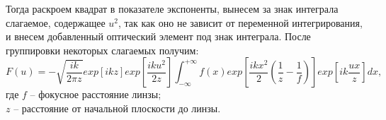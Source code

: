 {    Тогда раскроем квадрат в показателе экспоненты, вынесем за знак интеграла слагаемое, содержащее $u^2$,
    так как оно не зависит от переменной интегрирования, и внесем добавленный оптический элемент под знак интеграла.
    После группировки некоторых слагаемых получим:
    \begin{equation*}
        F(u) = - \sqrt{\frac{ik}{2 \pi z}}exp[ikz] exp[{ \frac{iku^2}{2z} }] \int_{-\infty}^{+\infty}f(x) exp[\frac{ikx^2}{2}( \frac{1}{z} - \frac{1}{f})] exp[{ik \frac{ux}{z}}]dx,
    \end{equation*}
    \tab    где $f$ -- фокусное расстояние линзы;\\
    \tab \tab \hspace{-0.4cm}$z$ -- расстояние от начальной плоскости до линзы.
    }\label{sec:обзор-теоретических-основ-для-ускоряющихся-пучков}
    \newpage


